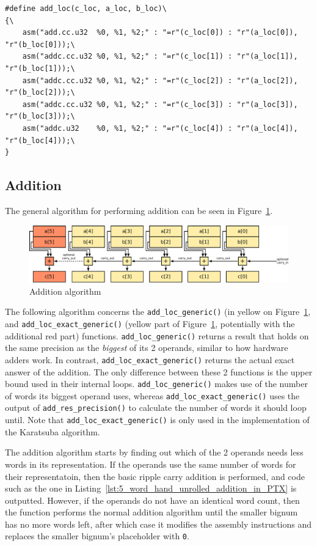 \documentclass[12pt, a4paper]{report}
\begin{document}
\begin{sloppypar}
\begin{lstlisting}
#define add_loc(c_loc, a_loc, b_loc)\
{\
    asm("add.cc.u32  %0, %1, %2;" : "=r"(c_loc[0]) : "r"(a_loc[0]), "r"(b_loc[0]));\
    asm("addc.cc.u32 %0, %1, %2;" : "=r"(c_loc[1]) : "r"(a_loc[1]), "r"(b_loc[1]));\
    asm("addc.cc.u32 %0, %1, %2;" : "=r"(c_loc[2]) : "r"(a_loc[2]), "r"(b_loc[2]));\
    asm("addc.cc.u32 %0, %1, %2;" : "=r"(c_loc[3]) : "r"(a_loc[3]), "r"(b_loc[3]));\
    asm("addc.u32    %0, %1, %2;" : "=r"(c_loc[4]) : "r"(a_loc[4]), "r"(b_loc[4]));\
}
\end{lstlisting}

\subsection{Addition}
The general algorithm for performing addition can be seen in
Figure~\ref{fig:addition}.

\begin{figure}[h]
\centering
\includegraphics[width=\linewidth]{figs/addition}
\caption{Addition algorithm}
\label{fig:addition}
\end{figure}

The following algorithm concerns the \verb+add_loc_generic()+ (in yellow on
Figure~\ref{fig:addition}, and \verb+add_loc_exact_generic()+ (yellow part of
Figure~\ref{fig:addition}, potentially with the additional red part) functions.
\verb+add_loc_generic()+ returns a result that holds on the same precision as
the \emph{biggest} of its 2 operands, similar to how hardware adders work.
In contrast, \verb+add_loc_exact_generic()+ returns the actual exact answer of
the addition. The only difference between these 2 functions is the upper bound
used in their internal loops. \verb+add_loc_generic()+ makes use of the number
of words its biggest operand uses, whereas \verb+add_loc_exact_generic()+ uses
the output of \verb+add_res_precision()+ to calculate the number of words it
should loop until.
Note that \verb+add_loc_exact_generic()+ is only used in the implementation of
the Karatsuba algorithm.

The addition algorithm starts by finding out which of the 2 operands needs less
words in its representation.
If the operands use the same number of words for their representatoin, then the
basic ripple carry addition is performed, and code such as the one in
Listing~\ref{lst:5_word_hand_unrolled_addition_in_PTX} is outputted.
However, if the operands do not have an identical word count, then the function
performs the normal addition algorithm until the smaller bignum has no more
words left, after which case it modifies the assembly instructions and replaces
the smaller bignum's placeholder with \verb+0+.


\end{sloppypar}
\end{document}
